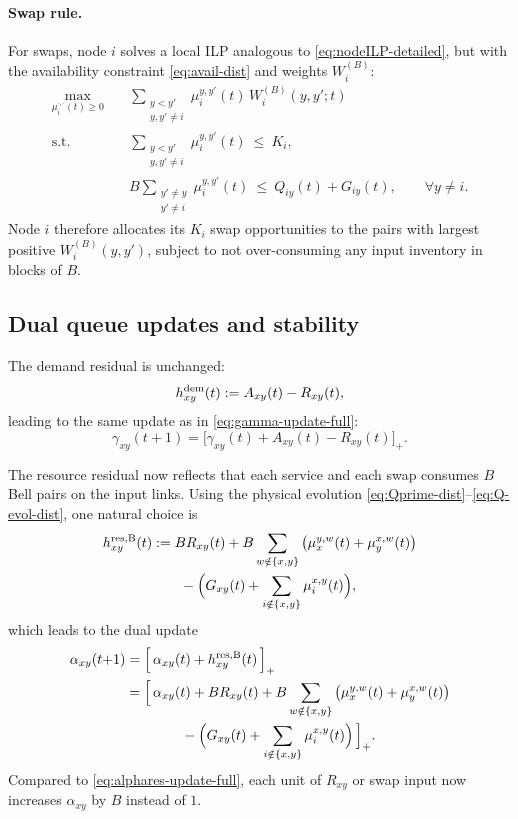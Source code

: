 \documentclass[11pt]{article}
\begin{document}
\paragraph{Swap rule.}
For swaps, node $i$ solves a local ILP analogous to
\eqref{eq:nodeILP-detailed}, but with the availability constraint
\eqref{eq:avail-dist} and weights $W_i^{(B)}$:
\begin{equation}
\begin{aligned}
\max_{\mu_i^{\cdot,\cdot}(t)\ge 0}\quad
&\sum_{\substack{y<y'\\ y,y'\neq i}}
\mu_i^{y,y'}(t)\,W_i^{(B)}(y,y';t) \\[2pt]
\text{s.t.}\quad
&\sum_{\substack{y<y'\\ y,y'\neq i}}
\mu_i^{y,y'}(t)\ \le\ K_i, \\
&B\sum_{\substack{y'\neq y\\ y'\neq i}}
\mu_i^{y,y'}(t)
\ \le\ Q_{iy}(t)+G_{iy}(t),
\qquad \forall y\neq i.
\end{aligned}
\label{eq:nodeILP-B}
\end{equation}
Node $i$ therefore allocates its $K_i$ swap opportunities to the
pairs with largest positive $W_i^{(B)}(y,y')$, subject to not
over-consuming any input inventory in blocks of $B$.

\subsection{Dual queue updates and stability}

The demand residual is unchanged:
\[
h^{\rm dem}_{xy}(t) := A_{xy}(t)-R_{xy}(t),
\]
leading to the same update as in \eqref{eq:gamma-update-full}:
\[
\gamma_{xy}(t{+}1)
=\big[\gamma_{xy}(t)+A_{xy}(t)-R_{xy}(t)\big]_+.
\]

The resource residual now reflects that each service and each swap
consumes $B$ Bell pairs on the input links. Using the physical
evolution \eqref{eq:Qprime-dist}--\eqref{eq:Q-evol-dist}, one
natural choice is
\begin{equation}
\begin{aligned}
h^{\rm res,B}_{xy}(t)
&:= B R_{xy}(t)
+ B\sum_{w\notin\{x,y\}}\big(\mu_x^{y,w}(t)+\mu_y^{x,w}(t)\big)\\
&\qquad
- \Big(
G_{xy}(t)
+\sum_{i\notin\{x,y\}}\mu_i^{x,y}(t)
\Big),
\end{aligned}
\label{eq:hres-B}
\end{equation}
which leads to the dual update
\begin{equation}
\begin{aligned}
\alpha_{xy}(t{+}1)
&=\Big[\,
\alpha_{xy}(t)+h^{\rm res,B}_{xy}(t)
\,\Big]_+\\
&=\Big[\,
\alpha_{xy}(t)
+ B R_{xy}(t)
+ B\sum_{w\notin\{x,y\}}\big(\mu_x^{y,w}(t)+\mu_y^{x,w}(t)\big)\\
&\qquad\qquad
- \Big(
G_{xy}(t)
+\sum_{i\notin\{x,y\}}\mu_i^{x,y}(t)
\Big)
\,\Big]_+.
\end{aligned}
\label{eq:alpha-update-B}
\end{equation}
Compared to \eqref{eq:alphares-update-full}, each unit of $R_{xy}$
or swap input now increases $\alpha_{xy}$ by $B$ instead of $1$.
\end{document}
